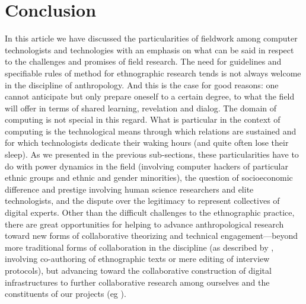 \documentclass[10pt,letter,oneside]{scrartcl}
\begin{document}


\section*{Conclusion}

In this article we have discussed the particularities of fieldwork
among computer technologists and technologies with an emphasis on what
can be said in respect to the challenges and promises of field
research. The need for guidelines and specifiable rules of method for
ethnographic research tends is not always welcome in the discipline of
anthropology.   And this is the case for good reasons: one cannot
anticipate but only prepare oneself to a certain degree, to what the
field will offer in terms of shared learning, revelation and
dialog. The domain of computing is not special in this regard. What is
particular in the context of computing is the technological means
through which relations are sustained and for which technologists
dedicate their waking hours (and quite often lose their sleep). As we
presented in the previous sub-sections, these particularities have to
do with power dynamics in the field (involving computer hackers of
particular ethnic groups and ethnic and gender minorities), the
question of socioeconomic difference and prestige involving human
science researchers and elite technologists, and the dispute over the
legitimacy to represent collectives of digital experts. Other than the difficult
challenges to the ethnographic practice, there are great opportunities
for helping to advance anthropological research toward new forms of
collaborative theorizing and technical engagement---beyond more
traditional forms of collaboration in the discipline (as described by
\cite{Lassiter200x}, involving co-authoring of ethnographic texts or mere
editing of interview protocols), but advancing toward the
collaborative construction of digital infrastructures to further
collaborative research among ourselves and the constituents of our
projects (eg \cite{FortunandFortun2015}).



\end{document}
